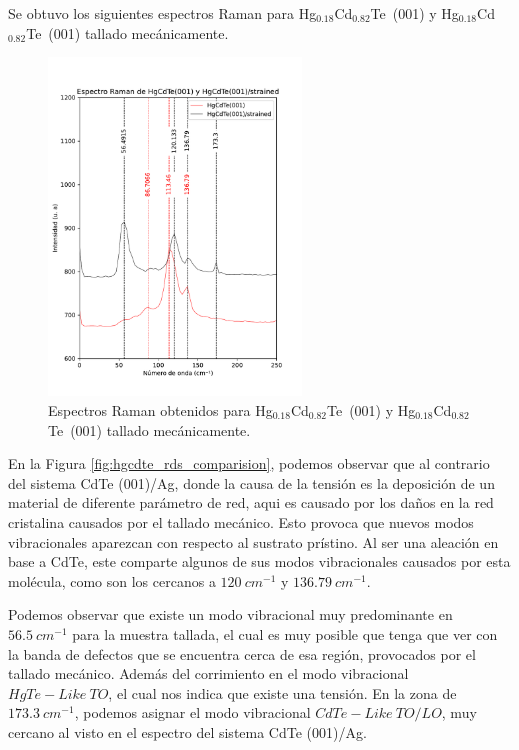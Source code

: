 Se obtuvo los siguientes espectros Raman para \mbox{Hg$_{0.18}$Cd$_{0.82}$Te (001)} y \mbox{Hg$_{0.18}$Cd$_{0.82}$Te (001)} tallado mecánicamente.
\begin{figure}[H]
    \centering
    \includegraphics[width=0.6\textwidth]{figures/chap4/hgcdte-strained/raman-results/raman-HgCdTe-250.pdf}
        \caption{Espectros Raman obtenidos para \mbox{Hg$_{0.18}$Cd$_{0.82}$Te (001)} y 
        \mbox{Hg$_{0.18}$Cd$_{0.82}$Te (001)} tallado mecánicamente.}
    \label{fig:hgcdte_rds_250}
\end{figure}

En la Figura \ref{fig:hgcdte_rds_comparision}, podemos observar que al contrario del sistema CdTe (001)/Ag, donde la causa de la tensión es la deposición de un material de diferente parámetro de red, aqui es causado por los daños en la red cristalina causados por el tallado mecánico. Esto provoca que nuevos modos vibracionales aparezcan con respecto al sustrato prístino. Al ser una aleación en base a CdTe, este comparte algunos de sus modos vibracionales causados por esta molécula, como son los cercanos a $120\ cm^{-1}$ y $136.79\ cm^{-1}$\cite{Qiu2021}.

Podemos observar que existe un modo vibracional muy predominante en $56.5\ cm^{-1}$ para la muestra tallada, el cual es muy posible que tenga que ver con la banda de defectos que se encuentra cerca de esa región, provocados por el tallado mecánico. Además del corrimiento en el modo vibracional $HgTe-Like\ TO$, el cual nos indica que existe una tensión. En la zona de $173.3\ cm^{-1}$, podemos asignar el modo vibracional $CdTe-Like\ TO/LO$, muy cercano al visto en el espectro del sistema CdTe (001)/Ag.

